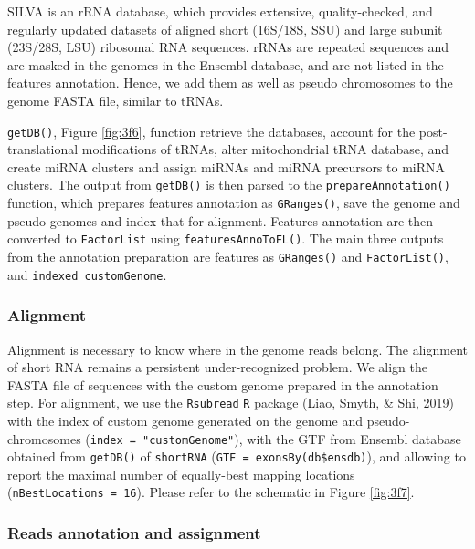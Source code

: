 \documentclass[12pt,twoside]{reedthesis}
\begin{document}
SILVA is an rRNA database, which provides extensive, quality-checked,
and regularly updated datasets of aligned short (16S/18S, SSU) and large
subunit (23S/28S, LSU) ribosomal RNA sequences. rRNAs are repeated
sequences and are masked in the genomes in the Ensembl database, and are
not listed in the features annotation. Hence, we add them as well as
pseudo chromosomes to the genome FASTA file, similar to tRNAs.

\texttt{getDB()}, Figure \ref{fig:3f6}, function retrieve the databases, account for the
post-translational modifications of tRNAs, alter mitochondrial tRNA
database, and create miRNA clusters and assign miRNAs and miRNA
precursors to miRNA clusters. The output from \texttt{getDB()} is then parsed to
the \texttt{prepareAnnotation()} function, which prepares features annotation as
\texttt{GRanges()}, save the genome and pseudo-genomes and index that for
alignment. Features annotation are then converted to \texttt{FactorList} using
\texttt{featuresAnnoToFL()}. The main three outputs from the annotation
preparation are features as \texttt{GRanges()} and \texttt{FactorList()}, and \texttt{indexed\ customGenome}.



\hypertarget{alignment}{%
\subsubsection{Alignment}\label{alignment}}

Alignment is necessary to know where in the genome reads belong. The
alignment of short RNA remains a persistent under-recognized problem. We
align the FASTA file of sequences with the custom genome prepared in the
annotation step. For alignment, we use the \texttt{Rsubread} \texttt{R} package
(\protect\hyperlink{ref-liao2019}{Liao, Smyth, \& Shi, 2019}) with the index of custom genome generated on the genome and
pseudo-chromosomes (\texttt{index\ =\ "customGenome"}), with the GTF from Ensembl
database obtained from \texttt{getDB()} of \texttt{shortRNA} (\texttt{GTF\ =\ exonsBy(db\$ensdb)}),
and allowing to report the maximal number of equally-best mapping
locations (\texttt{nBestLocations\ =\ 16}). Please refer to the schematic in Figure
\ref{fig:3f7}.



\hypertarget{reads-annotation-and-assignment}{%
\subsubsection{Reads annotation and assignment}\label{reads-annotation-and-assignment}}
\end{document}

